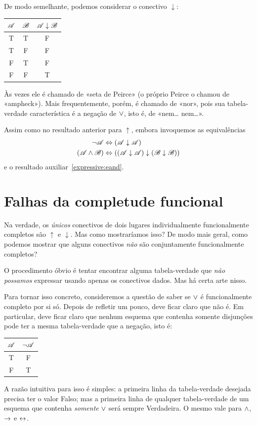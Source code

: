 De modo semelhante, podemos considerar o conectivo $\downarrow$:
\begin{center}
\begin{tabular}{c c | c}
$\mathscr{A}$ & $\mathscr{B}$ & $\mathscr{A} \mathrel{\downarrow} \mathscr{B}$\\
\hline
 T & T & F \\
 T & F & F  \\
 F & T & F  \\
 F & F & T
\end{tabular}
\end{center}
Às vezes ele é chamado de «seta de Peirce» (o próprio Peirce o chamou de «ampheck»). Mais frequentemente, porém, é chamado de «nor», pois sua tabela-verdade característica é a negação de $\vee$, isto é, de «nem\dots{} nem\dots».

Assim como no resultado anterior para $\uparrow$, embora invoquemos as equivalências
		\begin{align*}
			\neg \mathscr{A} &\Leftrightarrow (\mathscr{A} \downarrow \mathscr{A})\\
			(\mathscr{A} \wedge \mathscr{B}) & \Leftrightarrow ((\mathscr{A} \downarrow \mathscr{A}) \downarrow (\mathscr{B} \downarrow \mathscr{B}))
		\end{align*}
e o resultado auxiliar~\ref*{expressive:eand}.


\section{Falhas da completude funcional}

Na verdade, os \emph{únicos} conectivos de dois lugares individualmente funcionalmente completos são $\uparrow$ e $\downarrow$. Mas como mostraríamos isso? De modo mais geral, como podemos mostrar que alguns conectivos \emph{não} são conjuntamente funcionalmente completos?

O procedimento óbvio é tentar encontrar alguma tabela-verdade que \emph{não possamos} expressar usando apenas os conectivos dados. Mas há certa arte nisso.

Para tornar isso concreto, consideremos a questão de saber se $\vee$ é funcionalmente completo por si só. Depois de refletir um pouco, deve ficar claro que não é. Em particular, deve ficar claro que nenhum esquema que contenha somente disjunções pode ter a mesma tabela-verdade que a negação, isto é:
				\begin{center}
				\begin{tabular}{c | c}
				$\mathscr{A}$ & $\neg \mathscr{A}$\\
				\hline
				 T & F \\
				 F & T
				\end{tabular}
				\end{center}
A razão intuitiva para isso é simples: a primeira linha da tabela-verdade desejada precisa ter o valor Falso; mas a primeira linha de qualquer tabela-verdade de um esquema que contenha \emph{somente} $\vee$ será sempre Verdadeira. O mesmo vale para $\wedge$, $\rightarrow$ e $\leftrightarrow$.

